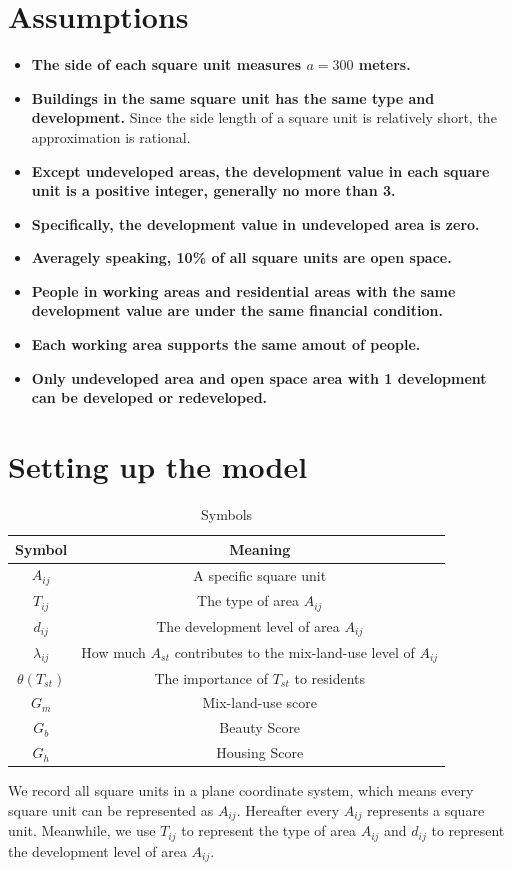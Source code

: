 \section{Assumptions}
\begin{itemize}
  \item \textbf{The side of each square unit measures $a = 300$ meters.}
  \item \textbf{Buildings in the same square unit has the same type and development.} Since the side length of a square unit is relatively short, the approximation is rational.
  \item \textbf{Except undeveloped areas, the development value in each square unit is a positive integer, generally no more than 3.}
  \item \textbf{Specifically, the development value in undeveloped area is zero.}
  \item \textbf{Averagely speaking, 10\% of all square units are open space.}
  \item \textbf{People in working areas and residential areas with the same development value are under the same financial condition.}
  \item \textbf{Each working area supports the same amout of people.}
  \item \textbf{Only undeveloped area and open space area with 1 development can be developed or redeveloped.}
\end{itemize}


\section{Setting up the model}
\begin{table}[h]
\centering
  \begin{tabular}{cc}
    \hline
    Symbol & Meaning \\
    \hline
    $A_{ij}$ & A specific square unit \\
    $T_{ij}$ & The type of area $ A_{ij} $\\
    $d_{ij}$ & The development level of area $ A_{ij} $\\
    $\lambda_{ij}$ & How much $ A_{st} $ contributes to the mix-land-use level of $ A_{ij} $ \\
    $\theta (T_{st})$ & The importance of $T_{st}$ to residents\\
    $G_m$ & Mix-land-use score\\
    $G_b$ & Beauty Score\\
    $G_h$ & Housing Score\\
    \hline
  \end{tabular}
  \caption{Symbols}
  \label{tab:symbols}
\end{table}
We record all square units in a plane coordinate system, which means every square unit can be represented as $ A_{ij}. $
Hereafter every $ A_{ij} $ represents a square unit.
Meanwhile, we use $ T_{ij} $ to represent the type of area $ A_{ij} $ and $ d_{ij} $ to represent the development level of area $ A_{ij} $.\\

